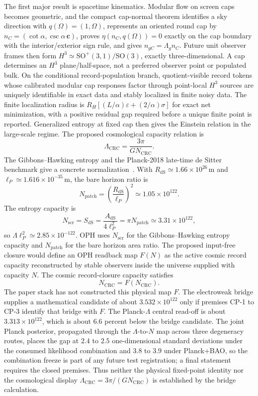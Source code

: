 \documentclass[11pt]{article}
\begin{document}
The first major result is spacetime kinematics. Modular flow on screen caps becomes geometric,
and the compact cap-normal theorem identifies a sky direction with \(q(\Omega)=(1,\Omega)\),
represents an oriented round cap by \(n_C=(\cot\alpha,\csc\alpha\,\mathbf c)\), proves
\(\eta(n_C,q(\Omega))=0\) exactly on the cap boundary with the interior/exterior sign rule, and
gives \(n_{gC}=\Lambda_g n_C\). Future unit observer frames then form
\(H^3\simeq\mathrm{SO}^+(3,1)/\mathrm{SO}(3)\), exactly three-dimensional. A cap determines an
\(H^3\) plane/half-space, not a preferred observer point or populated bulk. On the conditional
record-population branch, quotient-visible record tokens whose calibrated modular cap responses
factor through point-local \(H^3\) sources are uniquely identifiable in exact data and stably
localized in finite noisy data. The finite localization radius is
\(R_H[(L/\alpha)\varepsilon+(2/\alpha)\sigma]\) for exact net minimization, with a positive
residual gap required before a unique finite point is reported. Generalized entropy
at fixed cap then gives the Einstein relation in the large-scale regime. The proposed cosmological
capacity relation is
\[
\Lambda_{\mathrm{CRC}}=\frac{3\pi}{G N_{\mathrm{CRC}}}.
\]
The Gibbons--Hawking entropy and the Planck-2018 late-time de Sitter benchmark give a concrete normalization~\cite{gibbonsHawking77,planck18}. With
\(R_{\mathrm{dS}}\simeq1.66\times10^{26}\,\mathrm m\) and
\(\ell_P\simeq1.616\times10^{-35}\,\mathrm m\), the bare horizon ratio is
\[
N_{\mathrm{patch}}=\left(\frac{R_{\mathrm{dS}}}{\ell_P}\right)^2\simeq1.05\times10^{122}.
\]
The entropy capacity is
\[
N_{\mathrm{scr}}=S_{\mathrm{dS}}=\frac{A_{\mathrm{dS}}}{4\ell_P^2}
=\pi N_{\mathrm{patch}}\simeq3.31\times10^{122},
\]
so \(\Lambda\ell_P^2\simeq2.85\times10^{-122}\). OPH uses \(N_{\mathrm{scr}}\) for the
Gibbons--Hawking entropy capacity and \(N_{\mathrm{patch}}\) for the bare horizon area ratio.
The proposed input-free closure would define an OPH readback map \(F(N)\) as the active cosmic
record capacity reconstructed by stable observers inside the universe supplied with capacity
\(N\). The cosmic record-closure capacity satisfies
\[
N_{\mathrm{CRC}}=F(N_{\mathrm{CRC}}).
\]
The paper stack has not constructed this physical map \(F\). The electroweak bridge supplies a
mathematical candidate of about \(3.532\times10^{122}\) only if premises CP-1 to CP-3 identify
that bridge with \(F\). The Planck-\(\Lambda\) central read-off is about
\(3.313\times10^{122}\), which is about \(6.6\) percent below the bridge candidate. The joint
Planck posterior, propagated through the \(\Lambda\)-to-\(N\) map across three degeneracy routes,
places the gap at \(2.4\) to \(2.5\) one-dimensional standard deviations under the consumed
likelihood combination and \(3.8\) to \(3.9\) under Planck+BAO, so the combination freeze is part
of any future test registration; a final statement requires the closed premises. Thus neither
the physical fixed-point identity nor the cosmological display
\(\Lambda_{\mathrm{CRC}}=3\pi/(G N_{\mathrm{CRC}})\) is established by the bridge calculation.
\end{document}

